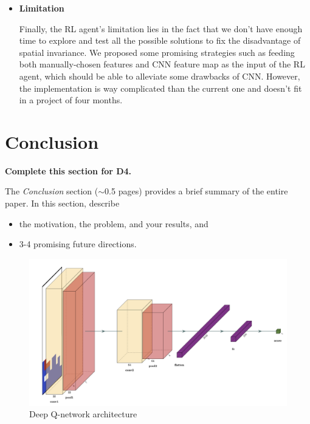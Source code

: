 \documentclass[letterpaper]{article} %
\begin{document}
\begin{itemize}
  \item \textbf{Limitation}
  
  Finally, the RL agent's limitation lies in the fact that we don't have enough time to explore and test all the possible solutions to fix the disadvantage of spatial invariance. We proposed some promising strategies such as feeding both manually-chosen features and CNN feature map as the input of the RL agent, which should be able to alleviate some drawbacks of CNN. However, the implementation is way complicated than the current one and doesn't fit in a project of four months.
  
\end{itemize}
  
  

\section{Conclusion}


{\bf Complete this section for D4.}

The {\it Conclusion} section ($\sim$0.5 pages) provides a brief summary of the entire paper.  In this section, describe 
\begin{itemize}
    \item the motivation, the problem, and your results, and
    \item 3-4 promising future directions.
\end{itemize}

\newpage






\begin{figure}[b!]
  \centering
  \includegraphics[width=0.75\linewidth]{figures/DQN.png}
  \caption{Deep Q-network architecture}
  \label{fig:DQN}
\end{figure}
\newpage$\,$\newpage
\end{document}
